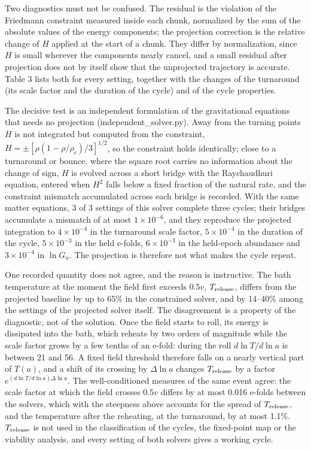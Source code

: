 \documentclass[11pt,a4paper]{article}
\begin{document}
Two diagnostics must not be confused. The residual is the violation of the Friedmann constraint measured inside each chunk, normalized by the sum of the absolute values of the energy components; the projection correction is the relative change of $H$ applied at the start of a chunk. They differ by normalization, since $H$ is small wherever the components nearly cancel, and a small residual after projection does not by itself show that the unprojected trajectory is accurate. Table 3 lists both for every setting, together with the changes of the turnaround (its scale factor and the duration of the cycle) and of the cycle properties.

The decisive test is an independent formulation of the gravitational equations that needs no projection (independent\_solver.py). Away from the turning points $H$ is not integrated but computed from the constraint, $H=\pm[\rho(1-\rho/\rho_c)/3]^{1/2}$, so the constraint holds identically; close to a turnaround or bounce, where the square root carries no information about the change of sign, $H$ is evolved across a short bridge with the Raychaudhuri equation, entered when $H^2$ falls below a fixed fraction of the natural rate, and the constraint mismatch accumulated across each bridge is recorded. With the same matter equations, 3 of 3 settings of this solver complete three cycles; their bridges accumulate a mismatch of at most $1\times10^{-6}$, and they reproduce the projected integration to $4\times10^{-4}$ in the turnaround scale factor, $5\times10^{-4}$ in the duration of the cycle, $5\times10^{-3}$ in the held e-folds, $6\times10^{-3}$ in the held-epoch abundance and $3\times10^{-4}$ in $\ln G_n$. The projection is therefore not what makes the cycle repeat.

One recorded quantity does not agree, and the reason is instructive. The bath temperature at the moment the field first exceeds $0.5v$, $T_{\rm release}$, differs from the projected baseline by up to 65\% in the constrained solver, and by 14--40\% among the settings of the projected solver itself. The disagreement is a property of the diagnostic, not of the solution. Once the field starts to roll, its energy is dissipated into the bath, which reheats by two orders of magnitude while the scale factor grows by a few tenths of an e-fold: during the roll $d\ln T/d\ln a$ is between 21 and 56. A fixed field threshold therefore falls on a nearly vertical part of $T(a)$, and a shift of its crossing by $\Delta\ln a$ changes $T_{\rm release}$ by a factor $e^{(d\ln T/d\ln a)\Delta\ln a}$. The well-conditioned measures of the same event agree: the scale factor at which the field crosses $0.5v$ differs by at most 0.016 e-folds between the solvers, which with the steepness above accounts for the spread of $T_{\rm release}$, and the temperature after the reheating, at the turnaround, by at most 1.1\%. $T_{\rm release}$ is not used in the classification of the cycles, the fixed-point map or the viability analysis, and every setting of both solvers gives a working cycle.
\end{document}
